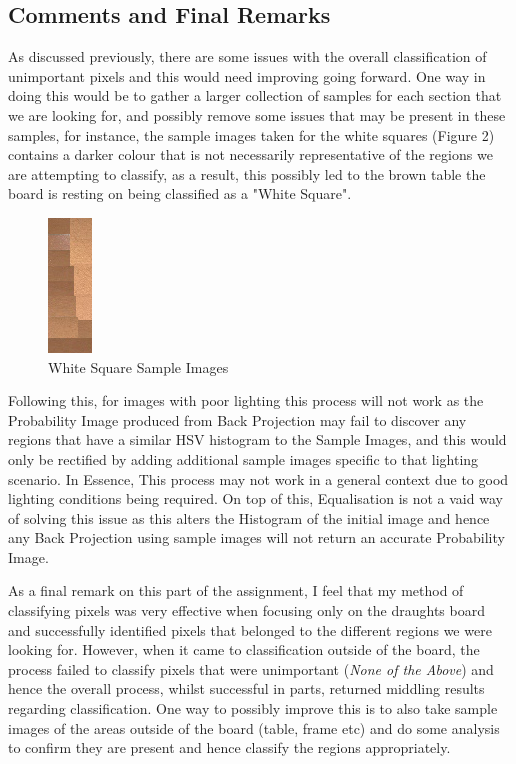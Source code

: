 \documentclass[11pt]{article}
\begin{document}
    \subsection{Comments and Final Remarks}
    \par
    As discussed previously, there are some issues with the overall classification of unimportant pixels and this would need improving going forward. One way in doing this would be to gather a larger collection of samples for each section
    that we are looking for, and possibly remove some issues that may be present in these samples, for instance, the sample images taken for the white squares (Figure 2) contains a darker colour that is not necessarily representative of the
    regions we are attempting to classify, as a result, this possibly led to the brown table the board is resting on being classified as a "White Square".
    \begin{figure}
        \centering
        \includegraphics[scale=1]{DraughtsGame1WhiteSquares.png}
        \caption{White Square Sample Images}
    \end{figure}
    \par
    Following this, for images with poor lighting this process will not work as the Probability Image produced from Back Projection may fail to discover any regions that have a similar HSV histogram to the Sample Images, and this would only be
    rectified by adding additional sample images specific to that lighting scenario. In Essence, This process may not work in a general context due to good lighting conditions being required. On top of this, Equalisation is not a vaid way of solving
    this issue as this alters the Histogram of the initial image and hence any Back Projection using sample images will not return an accurate Probability Image.
    \par
    As a final remark on this part of the assignment, I feel that my method of classifying pixels was very effective when focusing only on the draughts board and successfully identified pixels that belonged to the different regions we were looking for.
    However, when it came to classification outside of the board, the process failed to classify pixels that were unimportant (\emph{None of the Above}) and hence the overall process, whilst successful in parts, returned middling results regarding classification.
    One way to possibly improve this is to also take sample images of the areas outside of the board (table, frame etc) and do some analysis to confirm they are present and hence classify the regions appropriately.
    
\end{document}
